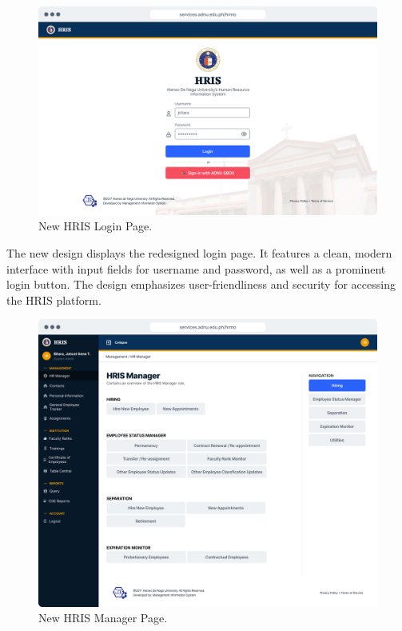     \begin{figure}[H]
        \centering
        \includegraphics[width=1\linewidth]{figures/app/login.png}
        \caption{New HRIS Login Page.}
        \label{fig:app-login}
    \end{figure}

    The new design displays the redesigned login page. It features a clean, modern interface with input fields for username and password, as well as a prominent login button. The design emphasizes user-friendliness and security for accessing the HRIS platform.

    \begin{figure}[H]
        \centering
        \includegraphics[width=1\linewidth]{figures/app/manager.png}
        \caption{New HRIS Manager Page.}
        \label{fig:app-manager}
    \end{figure}

